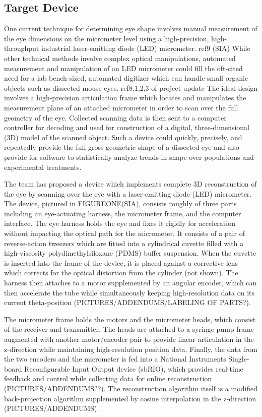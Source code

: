 \documentclass{article}
\begin{document}
\subsection{Target Device}
\label{sec:target-device}
One current technique for determining eye shape involves manual measurement of the eye dimensions on the micrometer level using a high-precision, high-throughput industrial laser-emitting diode (LED) micrometer. \cite{Nickerson}ref9 (SIA) While other technical methods involve complex optical manipulations, automated measurement and manipulation of an LED micrometer could fill the oft-cited need for a lab bench-sized, automated digitizer which can handle small organic objects such as dissected mouse eyes.\cite{schaeffel04,atchison04,zhou99:genes,zhou99:models} ref8,1,2,3 of project update  The ideal design involves a high-precision articulation frame which locates and manipulates the
measurement plane of an attached micrometer in order to scan over the full geometry of the eye. Collected scanning data is then sent to a computer controller for decoding and used for construction of a digital, three-dimensional (3D) model of the scanned object. Such a device could quickly, precisely, and repeatedly provide the full gross geometric shape of a dissected eye and also provide for software to statistically analyze trends in shape over populations and experimental treatments.

The team has proposed a device which implements complete 3D reconstruction of the eye by scanning over the eye with a laser-emitting diode (LED) micrometer. The device, pictured in FIGUREONE(SIA), consists roughly of three parts including an eye-actuating harness, the micrometer frame, and
the computer interface. The eye harness holds the eye and fixes it rigidly for acceleration without impacting the optical path for the micrometer. It consists of a pair of reverse-action tweezers which are fitted into a cylindrical cuvette filled with a high-viscosity polydimethylsiloxane (PDMS) buffer suspension. When the cuvette is inserted into the frame of the device, it is placed against a corrective lens which corrects for the optical distortion from the cylinder (not shown). The harness then attaches to a motor supplemented by an angular encoder, which can then accelerate the tube while simultaneously keeping high-resolution data on its current theta-position (PICTURES/ADDENDUMS/LABELING OF PARTS?).

The micrometer frame holds the motors and the micrometer heads, which consist of the receiver and transmitter. The heads are attached to a syringe pump frame augmented with another motor/encoder pair to provide linear articulation in the z-direction while maintaining high-resolution position data. Finally, the data from the two encoders and the micrometer is fed into a National Instruments Single-board Reconfigurable Input Output device (sbRIO), which provides real-time feedback and control while collecting data for online reconstruction (PICTURES/ADDENDUMS??). The reconstruction algorithm itself is a modified back-projection algorithm supplemented by cosine interpolation in the z-direction (PICTURES/ADDENDUMS).
\end{document}
